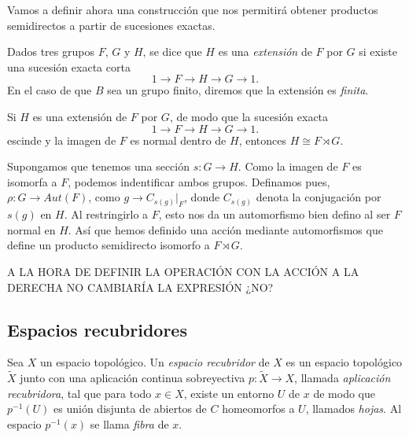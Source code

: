 \documentclass[TFG.tex]{subfiles}
\begin{document}
Vamos a definir ahora una construcción que nos permitirá obtener productos semidirectos a partir de sucesiones exactas.

\begin{defi}
Dados tres grupos $F$, $G$ y $H$, se dice que $H$ es una \emph{extensión} de $F$ por $G$ si existe una sucesión exacta corta
\[
1\to F\to H\to G\to 1.
\]
En el caso de que $B$ sea un grupo finito, diremos que la extensión es \emph{finita}.
\end{defi} 

\begin{prop}\label{semidirect}
Si $H$ es una extensión de $F$ por $G$, de modo que la sucesión exacta 
\[
1\to F\to H\to G\to 1.
\]
escinde y la imagen de $F$ es normal dentro de $H$, entonces $H\cong F\rtimes G$. 
\end{prop}

\begin{dem}
Supongamos que tenemos una sección $s:G\to H$. Como la imagen de $F$ es isomorfa a $F$, podemos indentificar ambos grupos. Definamos pues, $\rho:G\to Aut(F)$, como $g\to C_{s(g)}|_F$, donde $C_{s(g)}$ denota la conjugación por $s(g)$ en $H$. Al restringirlo a $F$, esto nos da un automorfismo bien defino al ser $F$ normal en $H$. Así que hemos definido una acción mediante automorfismos que define un producto semidirecto isomorfo a $F\rtimes G$. 
\QED
\end{dem}
% 
%
A LA HORA DE DEFINIR LA OPERACIÓN CON LA ACCIÓN A LA DERECHA NO CAMBIARÍA LA EXPRESIÓN ¿NO?

\subsection{Espacios recubridores}

\begin{defi}
Sea $X$ un espacio topológico. Un \emph{espacio recubridor} de $X$ es un espacio topológico $\tilde{X}$ junto con una aplicación continua sobreyectiva $p:\tilde{X}\to X$, llamada \emph{aplicación recubridora}, tal que para todo $x\in X$, existe un entorno $U$ de $x$ de modo que $p^{-1}(U)$ es unión disjunta de abiertos de $C$ homeomorfos a $U$, llamados \emph{hojas}. Al espacio $p^{-1}(x)$ se llama \emph{fibra} de $x$.
\end{defi}
\end{document}
